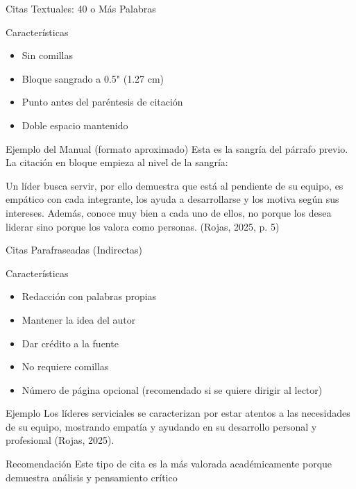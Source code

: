\documentclass[spanish,aspectratio=169]{beamer}
\begin{document}
\begin{frame}[fragile]{Citas Textuales: 40 o Más Palabras}
	\begin{block}{Características}
		\begin{itemize}
			\item Sin comillas
			\item Bloque sangrado a 0.5" (1.27 cm)
			\item Punto \alert{antes} del paréntesis de citación
			\item Doble espacio mantenido
		\end{itemize}
	\end{block}
	
	\begin{exampleblock}{Ejemplo del Manual (formato aproximado)}
		\footnotesize
		Esta es la sangría del párrafo previo. La citación en bloque empieza al nivel de la sangría:
		
		\hspace{0.5cm}\begin{minipage}{0.85\textwidth}
			Un líder busca servir, por ello demuestra que está al pendiente de su equipo, es empático con cada integrante, los ayuda a desarrollarse y los motiva según sus intereses. Además, conoce muy bien a cada uno de ellos, no porque los desea liderar sino porque los valora como personas. (Rojas, 2025, p. 5)
		\end{minipage}
	\end{exampleblock}
\end{frame}

\begin{frame}{Citas Parafraseadas (Indirectas)}
	\begin{block}{Características}
		\begin{itemize}
			\item Redacción con palabras propias
			\item Mantener la idea del autor
			\item Dar crédito a la fuente
			\item No requiere comillas
			\item Número de página opcional (recomendado si se quiere dirigir al lector)
		\end{itemize}
	\end{block}
	
	\begin{exampleblock}{Ejemplo}
		\small
		Los líderes serviciales se caracterizan por estar atentos a las necesidades de su equipo, mostrando empatía y ayudando en su desarrollo personal y profesional (Rojas, 2025).
	\end{exampleblock}
	
	\begin{alertblock}{Recomendación}
		Este tipo de cita es la más valorada académicamente porque demuestra análisis y pensamiento crítico
	\end{alertblock}
\end{frame}
\end{document}
